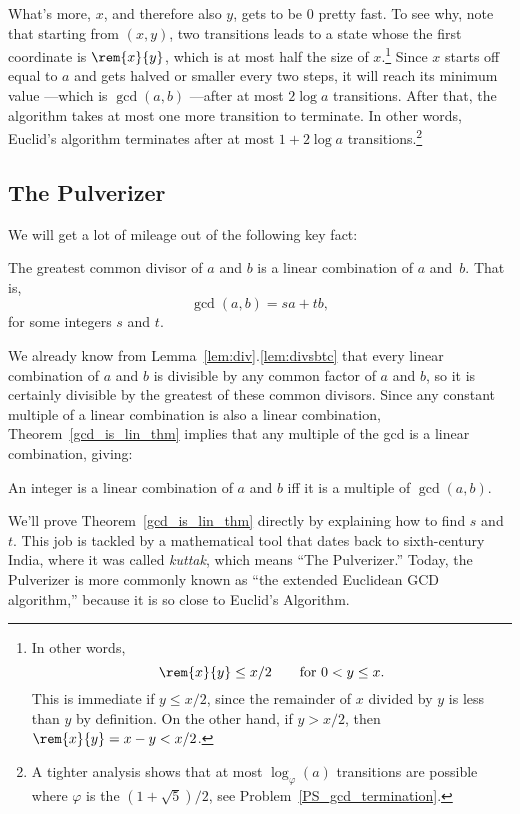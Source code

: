 What's more, $x$, and therefore also $y$, gets to be 0 pretty fast.
To see why, note that starting from $(x,y)$, two transitions leads to
a state whose the first coordinate is $\rem{x}{y}$, which is at most
half the size of $x$.\footnote{In other words,
\begin{equation}\label{rxylx2}
\rem{x}{y} \le x/2 \qquad \text{for $0 < y \le x$}.
\end{equation}
This is immediate if $y \le x/2$, since the remainder of $x$ divided
by $y$ is less than $y$ by definition.  On the other hand, if $y >
x/2$, then $\rem{x}{y} = x - y < x/2$.}  Since $x$ starts off equal to
$a$ and gets halved or smaller every two steps, it will reach its
minimum value ---which is $\gcd(a,b)$ ---after at most $2 \log a$
transitions.  After that, the algorithm takes at most one more
transition to terminate.  In other words, Euclid's algorithm
terminates after at most $1+2 \log a$ transitions.\footnote{A tighter
  analysis shows that at most $\log_\varphi(a)$ transitions are
  possible where $\varphi$ is the  $(1 +
  \sqrt{5})/2$, see Problem~\ref{PS_gcd_termination}.}

\subsection{The Pulverizer}\label{sec:pulverizer}
We will get a lot of mileage out of the following key fact:
\begin{theorem}\label{gcd_is_lin_thm}
The greatest common divisor of $a$ and $b$ is a linear combination of
$a$ and~$b$.  That is,
\[
\gcd(a, b) = s a + t b,
\]
for some integers $s$ and $t$.
\end{theorem}

We already know from Lemma~\ref{lem:div}.\ref{lem:divsbtc} that every
linear combination of $a$ and $b$ is divisible by any common factor of
$a$ and $b$, so it is certainly divisible by the greatest of these
common divisors.  Since any constant multiple of a linear combination
is also a linear combination, Theorem~\ref{gcd_is_lin_thm} implies
that any multiple of the gcd is a linear combination, giving:
\begin{corollary}\label{cor:lin-comb}
An integer is a linear combination of $a$ and $b$ iff it is a multiple
of $\gcd(a, b)$.
\end{corollary}

We'll prove Theorem~\ref{gcd_is_lin_thm} directly by explaining how to
find $s$ and $t$.  This job is tackled by a mathematical tool that
dates back to sixth-century India, where it was called \emph{kuttak},
which means ``The Pulverizer.''  Today, the Pulverizer is more
commonly known as ``the extended Euclidean GCD algorithm,'' because it
is so close to Euclid's Algorithm.

